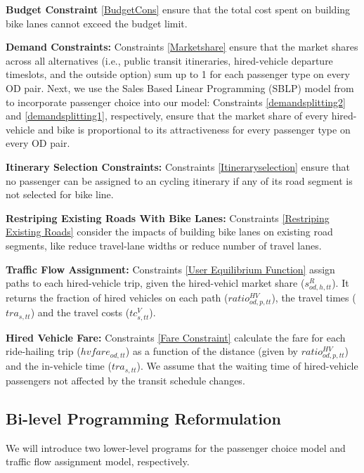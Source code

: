 \documentclass[trsc,nonblindrev]{informs3noheader}
\begin{document}
\textbf{Budget Constraint} \eqref{BudgetCons} ensure that the total cost spent on building bike lanes cannot exceed the budget limit. 

\textbf{Demand Constraints:} Constraints \eqref{Marketshare} ensure that the market shares across all alternatives (i.e., public transit itineraries, hired-vehicle departure timeslots, and the outside option) sum up to 1 for each passenger type on every OD pair. Next, we use the Sales Based Linear Programming (SBLP) model from \citet{Gallego2015} to incorporate passenger choice into our model: Constraints  \eqref{demandsplitting2} and \eqref{demandsplitting1}, respectively, ensure that the market share of every hired-vehicle and bike is proportional to its attractiveness for every passenger type on every OD pair. 

\textbf{Itinerary Selection Constraints:} Constraints \eqref{Itineraryselection} ensure that no passenger can be assigned to an cycling itinerary if any of its road segment is not selected for bike line. 

\textbf{Restriping Existing Roads With Bike Lanes:} Constraints \eqref{Restriping Existing Roads} consider the impacts of building bike lanes on existing road segments, like reduce travel-lane widths or reduce number of travel lanes.

\textbf{Traffic Flow Assignment:} Constraints \eqref{User Equilibrium Function} assign paths to each hired-vehicle trip, given the hired-vehicl market share ($s_{od,h,tt}^R$). %
It returns the fraction of hired vehicles on each path ($ratio^{HV}_{od,p,tt}$), the travel times ($tra_{s,tt}$) and the travel costs ($tc^V_{s,tt}$).

\textbf{Hired Vehicle Fare:} Constraints \eqref{Fare Constraint} calculate the fare for each ride-hailing trip ($hvfare_{od,tt}$) as a function of the distance (given by $ratio^{HV}_{od,p,tt}$) and the in-vehicle time ($tra_{s,tt}$). We assume that the waiting time of hired-vehicle passengers not affected by the transit schedule changes.

\subsection{Bi-level Programming Reformulation}
We will introduce two lower-level programs for the passenger choice model and traffic flow assignment model, respectively. 
\end{document}
